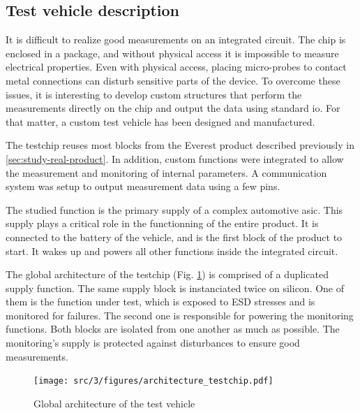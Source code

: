 \subsection{Test vehicle description}
\label{sec:test-vehicle-desc}

It is difficult to realize good measurements on an integrated circuit.
The chip is enclosed in a package, and without physical access it is impossible to measure electrical properties.
Even with physical access, placing micro-probes to contact metal connections can disturb sensitive parts of the device.
To overcome these issues, it is interesting to develop custom structures that perform the measurements directly on the chip and output the data using standard \gls{io}.
For that matter, a custom test vehicle has been designed and manufactured.

The testchip reuses most blocks from the Everest product described previously in \ref{sec:study-real-product}.
In addition, custom functions were integrated to allow the measurement and monitoring of internal parameters.
A communication system was setup to output measurement data using a few pins.


The studied function is the primary supply of a complex automotive \gls{asic}.
This supply plays a critical role in the functionning of the entire product.
It is connected to the battery of the vehicle, and is the first block of the product to start.
It wakes up and powers all other functions inside the integrated circuit.

The global architecture of the testchip (Fig. \ref{architecture_testchip}) is comprised of a duplicated supply function.
The same supply block is instanciated twice on silicon.
One of them is the function under test, which is exposed to \gls{ESD} stresses and is monitored for failures.
The second one is responsible for powering the monitoring functions.
Both blocks are isolated from one another as much as possible.
The monitoring's supply is protected against disturbances to ensure good measurements.

\begin{figure}[h]
  \centering
  \texttt{[image: src/3/figures/architecture\_testchip.pdf]}
  \caption{Global architecture of the test vehicle}
  \label{architecture_testchip}
\end{figure}

